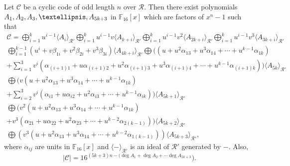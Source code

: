 \documentclass[10pt,a4paper]{amsart}
\begin{document}
\begin{theorem}\label{th4} Let $\mathcal{C}$ be a cyclic code of odd length $n$ over $\mathcal{R}$. Then there exist polynomials
		$A_1, A_2, A_3,\\ \dots , A_{5k+3}$ in $\mathbb F_{16}[x]$ which are factors of $x^n-1$ such that
\allowdisplaybreaks\begin{gather*}
		\mathcal{C}= \bigoplus_{i=1}^{k} u^{i-1}\langle A_{i}\rangle_{\mathcal{R}'}
  \bigoplus_{i=1}^{k} u^{i-1}v\langle A_{k+i}\rangle_{\mathcal{R}'} \bigoplus_{i=1}^{k} u^{i-1}v^2\langle A_{2k+i}\rangle_{\mathcal{R}'}  \bigoplus_{i=1}^{k} u^{i-1}v^3\langle A_{3k+i}\rangle_{\mathcal{R}'} \\
        \bigoplus_{i=1}^{k-1} (u^i+ v\beta_{1i} + v^2\beta_{2i} + v^3\beta_{3i}) \langle A_{4k+i}\rangle_{\mathcal{R}'}   \bigoplus ((u + u^2\alpha_{13} + u^3\alpha_{14} + \cdots + u^{k-1}\alpha_{1k})
     \\ + \sum_{i=1}^{3} v^i( \alpha_{(i+1)1} + u\alpha_{(i+1)2} + u^2\alpha_{(i+1)3} + u^3\alpha_{(i+1)4} + \cdots + u^{k-1}\alpha_{(i+1)k} ))\langle A_{5k}\rangle_{\mathcal{R}'}
     \\  \bigoplus   (v(u + u^2\alpha_{13} + u^3\alpha_{14} + \cdots + u^{k-1}\alpha_{1k})
       \\+ \sum_{i=2}^{3} v^i( \alpha_{i1} + u\alpha_{i2} + u^2\alpha_{i3} + \cdots + u^{k-1}\alpha_{ik} ))\langle A_{5k+1}\rangle_{\mathcal{R}'}
     \\  \bigoplus  (v^2(u + u^2\alpha_{13} + u^3\alpha_{14} + \cdots + u^{k-1}\alpha_{1k})
       \\+ v^3( \alpha_{21} + u\alpha_{22} + u^2\alpha_{23} +  \cdots + u^{k-2}\alpha_{2(k-1)}))\langle A_{5k+2}\rangle_{\mathcal{R}'}
     \\  \bigoplus  (v^3(u + u^2\alpha_{13} + u^3\alpha_{14} + \cdots + u^{k-2}\alpha_{1(k-1)}))\langle A_{5k+3}\rangle_{\mathcal{R}'},
		\end{gather*}
		where $\alpha_{ij} $ are units in $\mathbb F_{16}[x]$ and $\langle - \rangle_{\mathcal{R}'} $ is an ideal of $\mathcal{R}'$ generated by $-$. Also,
		$$|\mathcal{C}|=16^{(5k+3)n-(\deg A_1+\deg A_2+ \cdots \deg A_{5k+3} }).$$
	\end{theorem}
\end{document}
